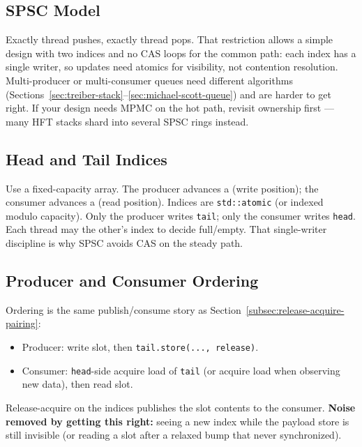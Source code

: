 \subsection{SPSC Model}
\label{subsec:spsc-model}
Exactly  thread pushes, exactly  thread pops. That restriction allows 
a simple design with two indices and no CAS loops for the common path: each index has a 
single writer, so updates need atomics for visibility, not contention resolution.
\newline
Multi-producer or multi-consumer queues need different algorithms 
(Sections~\ref{sec:treiber-stack}--\ref{sec:michael-scott-queue}) and are harder to get right. 
If your design needs MPMC on the hot path, revisit ownership first --- many HFT stacks 
shard into several SPSC rings instead.

\subsection{Head and Tail Indices}
\label{subsec:spsc-head-tail}
Use a fixed-capacity array. The producer advances a  (write position); the consumer 
advances a  (read position). Indices are \texttt{std::atomic} (or indexed modulo capacity).
\newline
Only the producer writes \texttt{tail}; only the consumer writes \texttt{head}. Each thread may 
 the other's index to decide full/empty. That single-writer discipline is why 
SPSC avoids CAS on the steady path.

\subsection{Producer and Consumer Ordering}
\label{subsec:spsc-producer-consumer-ordering}
Ordering is the same publish/consume story as Section~\ref{subsec:release-acquire-pairing}:
\begin{itemize}
    \item Producer: write slot, then \texttt{tail.store(..., release)}.
    \item Consumer: \texttt{head}-side acquire load of \texttt{tail} (or acquire load when observing 
          new data), then read slot.
\end{itemize}
Release-acquire on the indices publishes the slot contents to the consumer. 
\textbf{Noise removed by getting this right:} seeing a new index while the payload store is 
still invisible (or reading a slot after a relaxed bump that never synchronized).


